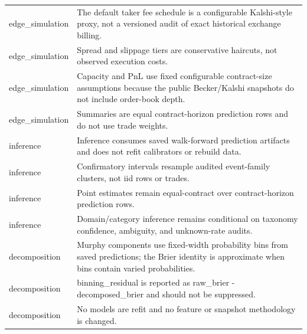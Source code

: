\begin{tabular}{ll}
edge\_simulation & The default taker fee schedule is a configurable Kalshi-style proxy, not a versioned audit of exact historical exchange billing. \\
edge\_simulation & Spread and slippage tiers are conservative haircuts, not observed execution costs. \\
edge\_simulation & Capacity and PnL use fixed configurable contract-size assumptions because the public Becker/Kalshi snapshots do not include order-book depth. \\
edge\_simulation & Summaries are equal contract-horizon prediction rows and do not use trade weights. \\
inference & Inference consumes saved walk-forward prediction artifacts and does not refit calibrators or rebuild data. \\
inference & Confirmatory intervals resample audited event-family clusters, not iid rows or trades. \\
inference & Point estimates remain equal-contract over contract-horizon prediction rows. \\
inference & Domain/category inference remains conditional on taxonomy confidence, ambiguity, and unknown-rate audits. \\
decomposition & Murphy components use fixed-width probability bins from saved predictions; the Brier identity is approximate when bins contain varied probabilities. \\
decomposition & binning\_residual is reported as raw\_brier - decomposed\_brier and should not be suppressed. \\
decomposition & No models are refit and no feature or snapshot methodology is changed. \\
\bottomrule
\end{tabular}
